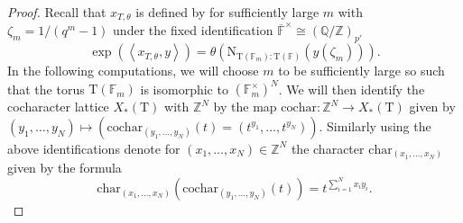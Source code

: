 \documentclass[12pt, reqno]{amsart}
\theoremstyle{definition}
\theoremstyle{definition}
\theoremstyle{definition}
\newcommand{\zIntegers}{\mathbb{Z}}
\newcommand{\multiplicativegroup}[1]{#1^{\times}}
\newcommand{\innerproduct}[2]{\left\langle #1,#2\right\rangle}
\newcommand{\aFieldNorm}{\mathrm{N}}
\newcommand{\finiteField}{\mathbb{F}}
\newcommand{\finiteFieldExtension}[1]{\finiteField_{#1}}
\newcommand{\algebraicClosure}[1]{\overline{#1}}
\newcommand{\algebraicGroup}[1]{\boldsymbol{\mathrm{#1}}}
\newcommand{\CocharacterLattice}[1]{X_{\ast}\left(#1\right)}
\newcommand{\Cocharacter}{\mathrm{cochar}}
\newcommand{\Character}{\mathrm{char}}
\begin{document}
\begin{proof}
Recall that $x_{T,\theta}$ is defined by for sufficiently large $m$ with $\zeta_m = 1/(q^m-1)$ under the fixed identification $\multiplicativegroup{\algebraicClosure{\finiteField}} \cong (\mathbb{Q}/\mathbb{Z})_{p'}$
$$
    \exp\left(\innerproduct{x_{T,\theta}}{y}\right) = \theta\left(\aFieldNorm_{\algebraicGroup{T}(\finiteField_m):\algebraicGroup{T}(\finiteField)}\left(y\left(\zeta_m\right)\right)\right).
$$
In the following computations, we will choose $m$ to be sufficiently large so such that the torus $\algebraicGroup{T}\left(\finiteField_m\right)$ is isomorphic to $\left(\multiplicativegroup{\finiteFieldExtension{m}}\right)^N$. We will then identify the cocharacter lattice $\CocharacterLattice{\algebraicGroup{T}}$ with $\zIntegers^N$ by the map $\Cocharacter \colon \zIntegers^N \to \CocharacterLattice{\algebraicGroup{T}}$ given by $\left(y_1,\dots,y_N\right) \mapsto \left(\Cocharacter_{(y_1,\dots,y_N)}\left(t\right) = \left(t^{y_1},\dots,t^{y_N}\right)\right)$. Similarly using the above identifications denote for $\left(x_1,\dots,x_N\right) \in \zIntegers^N$ the character $\Character_{(x_1,\dots,x_{N})}$ given by the formula $$\Character_{(x_1,\dots,x_{N})}\left(\Cocharacter_{(y_1,\dots, y_N)}\left(t\right)\right) = t^{\sum_{i=1}^N x_i y_i}.$$


\end{proof}
\end{document}
